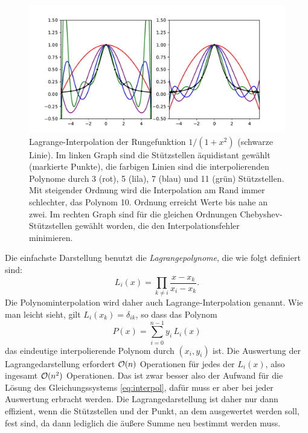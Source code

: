 \begin{figure}
  \centering
  \includegraphics[width=\textwidth]{plots/runge_lagrange}
  \caption{Lagrange-Interpolation der Rungefunktion $1/(1+x^2)$
    (schwarze Linie). Im linken Graph sind die Stützstellen
    äquidistant gewählt (markierte Punkte), die farbigen Linien sind
    die interpolierenden Polynome durch 3 (rot), 5 (lila), 7 (blau)
    und 11 (grün) Stützstellen. Mit steigender Ordnung wird die
    Interpolation am Rand immer schlechter, das Polynom 10. Ordnung
    erreicht Werte bis nahe an zwei. Im rechten Graph sind
    für die gleichen Ordnungen Chebyshev-Stützstellen gewählt worden,
    die den Interpolationsfehler minimieren.}
  \label{fig:runge}
\end{figure}

Die einfachste Darstellung benutzt die \emph{Lagrangepolynome}, die
wie folgt definiert sind:
\begin{equation}
  \label{eq:lagrange}
  L_i(x) = \prod_{k\neq i} \frac{x-x_k}{x_i-x_k}.
\end{equation}
Die Polynominterpolation wird daher auch Lagrange-Interpolation
genannt.  Wie man leicht sieht, gilt $L_i(x_k) = \delta_{ik}$, so dass
das Polynom
\begin{equation}
  P(x) = \sum_{i=0}^{n-1} y_i\,L_i(x)
\end{equation}
das eindeutige interpolierende Polynom durch $(x_i, y_i)$ ist. Die
Auswertung der Lagrangedarstellung erfordert $\mathcal O(n)$ Operationen für
jedes der $L_i(x)$, also ingesamt $\mathcal O(n^2)$ Operationen. Das ist zwar
besser also der Aufwand für die Lösung des Gleichungssystems
\eqref{eq:interpol}, dafür muss er aber bei jeder Auswertung erbracht
werden.  Die Lagrangedarstellung ist daher nur dann effizient, wenn
die Stützstellen und der Punkt, an dem ausgewertet werden soll, fest
sind, da dann lediglich die äußere Summe neu bestimmt werden muss.

